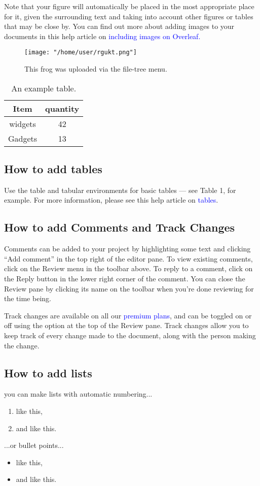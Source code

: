 \documentclass{article}
\begin{document}
	Note that your figure will automatically be placed in the most appropriate place for it, given the
	surrounding text and taking into account other figures or tables that may be close by. You can find
	out more about adding images to your documents in this help article on \textcolor{blue}{including images on Overleaf.}
\begin{figure}[tbph]
	\centering
	\texttt{[image: "/home/user/rgukt.png"]}
	\caption{This frog was uploaded via the file-tree menu.}
	\label{fig:k}
\end{figure}
\begin{table}
	\centering
	{\begin{tabular}{c|c}
			Item & quantity\\
			\hline
			widgets & 42\\
			Gadgets & 13
		\end{tabular}
	\caption{An  example table.}

}
\end{table}
	
\subsection{How to add tables}
	Use the table and tabular environments for basic tables — see Table 1, for example. For more information, please see this help article on \textcolor{blue}{tables}.
	
	\subsection{How to add Comments and Track Changes}
	Comments can be added to your project by highlighting some text and clicking “Add comment” in
	the top right of the editor pane. To view existing comments, click on the Review menu in the toolbar
	above. To reply to a comment, click on the Reply button in the lower right corner of the comment.
	You can close the Review pane by clicking its name on the toolbar when you’re done reviewing for the
	time being.
	
	Track changes are available on all our 
	 \textcolor{blue}{premium plans}, and can be toggled on or off using the option
	at the top of the Review pane. Track changes allow you to keep track of every change made to the
	document, along with the person making the change.
\subsection{How to add lists}
you can make lists with automatic numbering...
\begin{enumerate}
\item like this,
\item and like this.
\end{enumerate}
...or bullet points...
\begin{itemize}
	\item like this,
	\item and like this.
\end{itemize}
\end{document}

